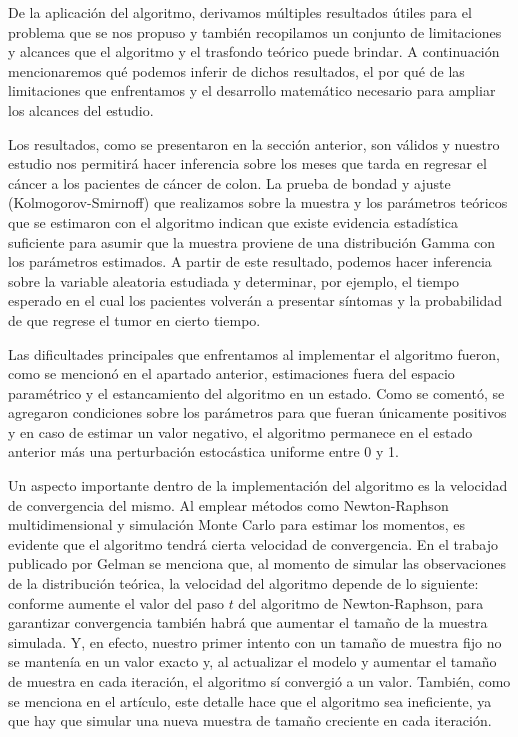 \documentclass[9pt,twocolumn,twoside,]{pnas-new}
\begin{document}
De la aplicación del algoritmo, derivamos múltiples resultados útiles
para el problema que se nos propuso y también recopilamos un conjunto de
limitaciones y alcances que el algoritmo y el trasfondo teórico puede
brindar. A continuación mencionaremos qué podemos inferir de dichos
resultados, el por qué de las limitaciones que enfrentamos y el
desarrollo matemático necesario para ampliar los alcances del estudio.

Los resultados, como se presentaron en la sección anterior, son válidos
y nuestro estudio nos permitirá hacer inferencia sobre los meses que
tarda en regresar el cáncer a los pacientes de cáncer de colon. La
prueba de bondad y ajuste (Kolmogorov-Smirnoff) que realizamos sobre la
muestra y los parámetros teóricos que se estimaron con el algoritmo
indican que existe evidencia estadística suficiente para asumir que la
muestra proviene de una distribución Gamma con los parámetros estimados.
A partir de este resultado, podemos hacer inferencia sobre la variable
aleatoria estudiada y determinar, por ejemplo, el tiempo esperado en el
cual los pacientes volverán a presentar síntomas y la probabilidad de
que regrese el tumor en cierto tiempo.

Las dificultades principales que enfrentamos al implementar el algoritmo
fueron, como se mencionó en el apartado anterior, estimaciones fuera del
espacio paramétrico y el estancamiento del algoritmo en un estado. Como
se comentó, se agregaron condiciones sobre los parámetros para que
fueran únicamente positivos y en caso de estimar un valor negativo, el
algoritmo permanece en el estado anterior más una perturbación
estocástica uniforme entre 0 y 1.

Un aspecto importante dentro de la implementación del algoritmo es la
velocidad de convergencia del mismo. Al emplear métodos como
Newton-Raphson multidimensional y simulación Monte Carlo para estimar
los momentos, es evidente que el algoritmo tendrá cierta velocidad de
convergencia. En el trabajo publicado por Gelman se menciona que, al
momento de simular las observaciones de la distribución teórica, la
velocidad del algoritmo depende de lo siguiente: conforme aumente el
valor del paso \(t\) del algoritmo de Newton-Raphson, para garantizar
convergencia también habrá que aumentar el tamaño de la muestra
simulada. Y, en efecto, nuestro primer intento con un tamaño de muestra
fijo no se mantenía en un valor exacto y, al actualizar el modelo y
aumentar el tamaño de muestra en cada iteración, el algoritmo sí
convergió a un valor. También, como se menciona en el artículo, este
detalle hace que el algoritmo sea ineficiente, ya que hay que simular
una nueva muestra de tamaño creciente en cada iteración.
\end{document}
